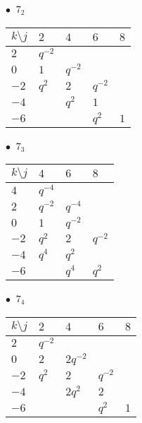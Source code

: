 %
\begin{minipage}{\linewidth}
$\bullet\ $ $7_{2}$ \vspace{0.5em} \\
\begin{tabular}{l|llll}
$k \setminus j$ & $2$ & $4$ & $6$ & $8$ \\
\hline
$2$ & $q^{-2}$ &  &  &  \\
$0$ & $1$ & $q^{-2}$ &  &  \\
$-2$ & $q^{2}$ & $2$ & $q^{-2}$ &  \\
$-4$ &  & $q^{2}$ & $1$ &  \\
$-6$ &  &  & $q^{2}$ & $1$ \\
\end{tabular}
\vspace{2em}
\end{minipage}
%
\begin{minipage}{\linewidth}
$\bullet\ $ $7_{3}$ \vspace{0.5em} \\
\begin{tabular}{l|lll}
$k \setminus j$ & $4$ & $6$ & $8$ \\
\hline
$4$ & $q^{-4}$ &  &  \\
$2$ & $q^{-2}$ & $q^{-4}$ &  \\
$0$ & $1$ & $q^{-2}$ &  \\
$-2$ & $q^{2}$ & $2$ & $q^{-2}$ \\
$-4$ & $q^{4}$ & $q^{2}$ &  \\
$-6$ &  & $q^{4}$ & $q^{2}$ \\
\end{tabular}
\vspace{2em}
\end{minipage}
%
\begin{minipage}{\linewidth}
$\bullet\ $ $7_{4}$ \vspace{0.5em} \\
\begin{tabular}{l|llll}
$k \setminus j$ & $2$ & $4$ & $6$ & $8$ \\
\hline
$2$ & $q^{-2}$ &  &  &  \\
$0$ & $2$ & $2q^{-2}$ &  &  \\
$-2$ & $q^{2}$ & $2$ & $q^{-2}$ &  \\
$-4$ &  & $2q^{2}$ & $2$ &  \\
$-6$ &  &  & $q^{2}$ & $1$ \\
\end{tabular}
\vspace{2em}
\end{minipage}
